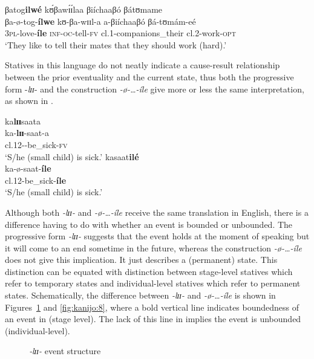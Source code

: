 \documentclass[output=paper,newtxmath,modfonts,nonflat,draftmode]{langsci/langscibook}
\begin{document}
\ex 
    \glll   βatog\textbf{ilwé}          kʊ́βawɪ́ɪ́laa βiíchaaβó    βátʊmame\\       
            βa-ø-tog-\textbf{ílwe}    kʊ-βa-wɪɪl-a    a-βiíchaaβó     βá-tʊmám-eé\\          
    3\textsc{pl}-love-\textbf{íle}       \textsc{inf}-\textsc{oc}-tell-\textsc{fv} cl.1-companions\_their    cl.2-work-\textsc{opt}\\
  \glt ‘They like to tell their mates that they should work (hard).’
\z
\z

Statives in this language do not neatly indicate a cause-result relationship between the prior eventuality and the current state, thus both the progressive form -\textit{lɪɪ}- and the construction \textit{-ø-…-íle} give more or less the same interpretation, as shown in . 

\ea \label{ex:kanijo:19}
\ea 
    \glll ka\textbf{l}\textbf{ɪɪ}saata\\   
    ka-\textbf{lɪɪ}-saat-a\\                              
     cl.12-\textbf{}-be\_sick-\textsc{fv}\\            
    \glt `S/he (small child) is sick.’         
\ex 
\glll kasaat\textbf{ilé}\\
ka-ø-saat-\textbf{íle}\\
cl.12-be\_sick-\textbf{íle}\\
\glt `S/he (small child) is sick.’ 
\z
\z

Although both \textit{-lɪɪ-} and \textit{-ø-\ldots-íle} receive the same translation in English, there is a difference having to do with whether an event is bounded or unbounded. The progressive form \textit{-lɪɪ-} suggests that the event holds at the moment of speaking but it will come to an end sometime in the future, whereas the construction \textit{-ø-\ldots-íle} does not give this implication. It just describes a (permanent) state. This distinction can be equated with  distinction between stage-level statives which refer to temporary states and individual-level statives which refer to permanent states. Schematically, the difference between \textit{-lɪɪ-} and \textit{-ø-\ldots-íle} is shown in Figures~\ref{fig:kanijo:7} and \ref{fig:kanijo:8}, where a bold vertical line indicates boundedness of an event in  (stage level). The lack of this line in \textup{} implies the event is unbounded (individual-level). 


\begin{figure}
\caption{\textit{‑lɪɪ-} event structure\label{fig:kanijo:7}}
\end{figure}
\end{document}
